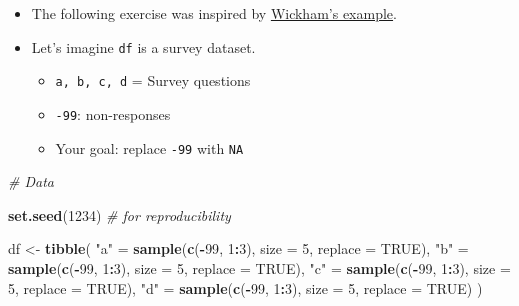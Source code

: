\documentclass[
]{book}
\newenvironment{Shaded}{\begin{snugshade}}{\end{snugshade}}
\newcommand{\AttributeTok}[1]{\textcolor[rgb]{0.13,0.29,0.53}{#1}}
\newcommand{\CommentTok}[1]{\textcolor[rgb]{0.56,0.35,0.01}{\textit{#1}}}
\newcommand{\ConstantTok}[1]{\textcolor[rgb]{0.56,0.35,0.01}{#1}}
\newcommand{\DecValTok}[1]{\textcolor[rgb]{0.00,0.00,0.81}{#1}}
\newcommand{\FunctionTok}[1]{\textcolor[rgb]{0.13,0.29,0.53}{\textbf{#1}}}
\newcommand{\NormalTok}[1]{#1}
\newcommand{\OtherTok}[1]{\textcolor[rgb]{0.56,0.35,0.01}{#1}}
\newcommand{\SpecialCharTok}[1]{\textcolor[rgb]{0.81,0.36,0.00}{\textbf{#1}}}
\newcommand{\StringTok}[1]{\textcolor[rgb]{0.31,0.60,0.02}{#1}}
\begin{document}
\begin{itemize}
\item
  The following exercise was inspired by \href{http://adv-r.had.co.nz/Functional-programming.html}{Wickham's example}.
\item
  Let's imagine \texttt{df} is a survey dataset.

  \begin{itemize}
  \item
    \texttt{a,\ b,\ c,\ d} = Survey questions
  \item
    \texttt{-99}: non-responses
  \item
    Your goal: replace \texttt{-99} with \texttt{NA}
  \end{itemize}
\end{itemize}

\begin{Shaded}
\begin{Highlighting}[]
\CommentTok{\# Data}

\FunctionTok{set.seed}\NormalTok{(}\DecValTok{1234}\NormalTok{) }\CommentTok{\# for reproducibility}

\NormalTok{df }\OtherTok{\textless{}{-}} \FunctionTok{tibble}\NormalTok{(}
  \StringTok{"a"} \OtherTok{=} \FunctionTok{sample}\NormalTok{(}\FunctionTok{c}\NormalTok{(}\SpecialCharTok{{-}}\DecValTok{99}\NormalTok{, }\DecValTok{1}\SpecialCharTok{:}\DecValTok{3}\NormalTok{), }\AttributeTok{size =} \DecValTok{5}\NormalTok{, }\AttributeTok{replace =} \ConstantTok{TRUE}\NormalTok{),}
  \StringTok{"b"} \OtherTok{=} \FunctionTok{sample}\NormalTok{(}\FunctionTok{c}\NormalTok{(}\SpecialCharTok{{-}}\DecValTok{99}\NormalTok{, }\DecValTok{1}\SpecialCharTok{:}\DecValTok{3}\NormalTok{), }\AttributeTok{size =} \DecValTok{5}\NormalTok{, }\AttributeTok{replace =} \ConstantTok{TRUE}\NormalTok{),}
  \StringTok{"c"} \OtherTok{=} \FunctionTok{sample}\NormalTok{(}\FunctionTok{c}\NormalTok{(}\SpecialCharTok{{-}}\DecValTok{99}\NormalTok{, }\DecValTok{1}\SpecialCharTok{:}\DecValTok{3}\NormalTok{), }\AttributeTok{size =} \DecValTok{5}\NormalTok{, }\AttributeTok{replace =} \ConstantTok{TRUE}\NormalTok{),}
  \StringTok{"d"} \OtherTok{=} \FunctionTok{sample}\NormalTok{(}\FunctionTok{c}\NormalTok{(}\SpecialCharTok{{-}}\DecValTok{99}\NormalTok{, }\DecValTok{1}\SpecialCharTok{:}\DecValTok{3}\NormalTok{), }\AttributeTok{size =} \DecValTok{5}\NormalTok{, }\AttributeTok{replace =} \ConstantTok{TRUE}\NormalTok{)}
\NormalTok{)}
\end{Highlighting}
\end{Shaded}
\end{document}
